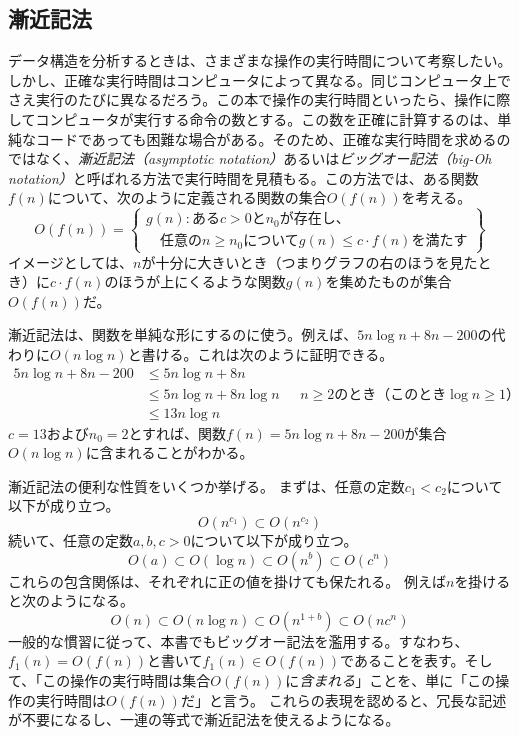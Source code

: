 \subsection{漸近記法}

  
データ構造を分析するときは、さまざまな操作の実行時間について考察したい。しかし、正確な実行時間はコンピュータによって異なる。同じコンピュータ上でさえ実行のたびに異なるだろう。この本で操作の実行時間といったら、操作に際してコンピュータが実行する命令の数とする。この数を正確に計算するのは、単純なコードであっても困難な場合がある。そのため、正確な実行時間を求めるのではなく、\emph{漸近記法（asymptotic notation）}あるいは\emph{ビッグオー記法（big-Oh notation）}と呼ばれる方法で実行時間を見積もる。この方法では、ある関数$f(n)$について、次のように定義される関数の集合$O(f(n))$を考える。%
\[
   O(f(n)) = \left\{
     \begin{array}{l}
       g(n):\mbox{ある$c>0$と$n_0$が存在し、} \\
             \quad\mbox{任意の$n\ge n_0$について$g(n) \le c\cdot f(n)$を満たす}
     \end{array} \right\}
\]
イメージとしては、$n$が十分に大きいとき（つまりグラフの右のほうを見たとき）に$c\cdot f(n)$のほうが上にくるような関数$g(n)$を集めたものが集合$O(f(n))$だ。 %

漸近記法は、関数を単純な形にするのに使う。例えば、$5n\log n + 8n - 200$の代わりに$O(n \log n)$と書ける。これは次のように証明できる。
\begin{align*}
       5n\log n + 8n - 200
        & \le 5n\log n + 8n \\
        & \le 5n\log n + 8n\log n & \mbox{ $n\ge 2$のとき（このとき$\log n \ge 1$）}
            \\
        & \le 13n\log n
\end{align*}
$c = 13$および$n_0 = 2$とすれば、関数$f(n)= 5n \log n + 8n-200$が集合$O(n \log n)$に含まれることがわかる。

漸近記法の便利な性質をいくつか挙げる。
まずは、任意の定数$c_1 < c_2$について以下が成り立つ。
\[ O(n^{c_1}) \subset O(n^{c_2}) \]
続いて、任意の定数$ a, b, c> 0 $について以下が成り立つ。
\[ O(a) \subset O(\log n) \subset O(n^{b}) \subset O({c}^n) \]
これらの包含関係は、それぞれに正の値を掛けても保たれる。
例えば$n$を掛けると次のようになる。
\[ O(n) \subset O(n\log n) \subset O(n^{1+b}) \subset O(n{c}^n) \]
一般的な慣習に従って、本書でもビッグオー記法を濫用する。すなわち、$f_1(n) = O(f(n))$と書いて$f_1(n) \in O(f(n))$であることを表す。そして、「この操作の実行時間は集合$O(f(n))$に\emph{含まれる}」ことを、単に「この操作の実行時間は$O(f(n))$だ」と言う。
これらの表現を認めると、冗長な記述が不要になるし、一連の等式で漸近記法を使えるようになる。

